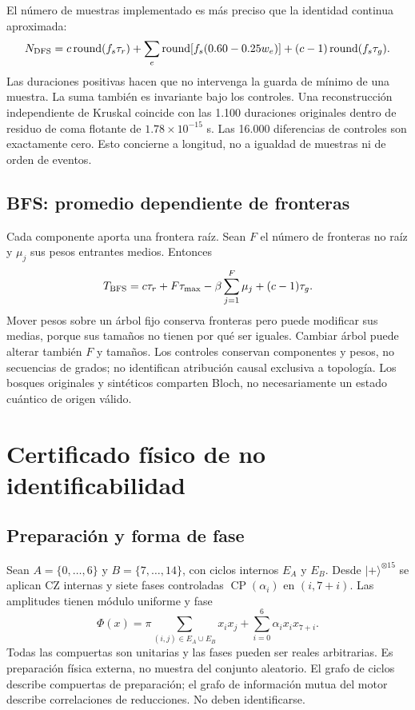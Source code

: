 \documentclass[11pt,a4paper]{article}
\begin{document}
El número de muestras implementado es más preciso que la identidad continua aproximada:
\[
N_{\rm DFS}=c\operatorname{round}(f_s\tau_r)+\sum_e\operatorname{round}[f_s(0.60-0.25w_e)]+(c-1)\operatorname{round}(f_s\tau_g).
\]
Las duraciones positivas hacen que no intervenga la guarda de mínimo de una muestra. La suma también es invariante bajo los controles. Una reconstrucción independiente de Kruskal coincide con las 1.100 duraciones originales dentro de residuo de coma flotante de $1.78\times10^{-15}$ s. Las 16.000 diferencias de controles son exactamente cero. Esto concierne a longitud, no a igualdad de muestras ni de orden de eventos.

\subsection{BFS: promedio dependiente de fronteras}
Cada componente aporta una frontera raíz. Sean $F$ el número de fronteras no raíz y $\mu_j$ sus pesos entrantes medios. Entonces
\[
T_{\rm BFS}=c\tau_r+F\tau_{\max}-\beta\sum_{j=1}^F\mu_j+(c-1)\tau_g.
\]
Mover pesos sobre un árbol fijo conserva fronteras pero puede modificar sus medias, porque sus tamaños no tienen por qué ser iguales. Cambiar árbol puede alterar también $F$ y tamaños. Los controles conservan componentes y pesos, no secuencias de grados; no identifican atribución causal exclusiva a topología. Los bosques originales y sintéticos comparten Bloch, no necesariamente un estado cuántico de origen válido.

\section{Certificado físico de no identificabilidad}
\subsection{Preparación y forma de fase}
Sean $A=\{0,\ldots,6\}$ y $B=\{7,\ldots,14\}$, con ciclos internos $E_A$ y $E_B$. Desde $|+\rangle^{\otimes15}$ se aplican CZ internas y siete fases controladas $\operatorname{CP}(\alpha_i)$ en $(i,7+i)$. Las amplitudes tienen módulo uniforme y fase
\[
\Phi(x)=\pi\sum_{(i,j)\in E_A\cup E_B}x_ix_j+\sum_{i=0}^{6}\alpha_i x_i x_{7+i}.
\]
Todas las compuertas son unitarias y las fases pueden ser reales arbitrarias. Es preparación física externa, no muestra del conjunto aleatorio. El grafo de ciclos describe compuertas de preparación; el grafo de información mutua del motor describe correlaciones de reducciones. No deben identificarse.
\end{document}
